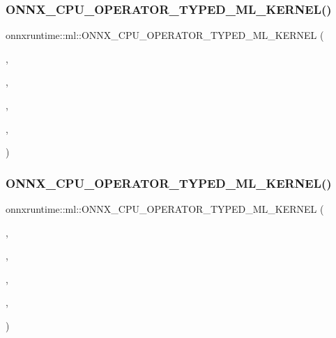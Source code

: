 \subsubsection{\texorpdfstring{O\+N\+N\+X\+\_\+\+C\+P\+U\+\_\+\+O\+P\+E\+R\+A\+T\+O\+R\+\_\+\+T\+Y\+P\+E\+D\+\_\+\+M\+L\+\_\+\+K\+E\+R\+N\+E\+L()}{ONNX\_CPU\_OPERATOR\_TYPED\_ML\_KERNEL()}\hspace{0.1cm}{\footnotesize\ttfamily [5/8]}}
{\footnotesize\ttfamily onnxruntime\+::ml\+::\+O\+N\+N\+X\+\_\+\+C\+P\+U\+\_\+\+O\+P\+E\+R\+A\+T\+O\+R\+\_\+\+T\+Y\+P\+E\+D\+\_\+\+M\+L\+\_\+\+K\+E\+R\+N\+EL (\begin{DoxyParamCaption}\item[{Scaler}]{,  }\item[{1}]{,  }\item[{float}]{,  }\item[{\mbox{\hyperlink{classonnxruntime_1_1KernelDefBuilder}{Kernel\+Def\+Builder}}().Type\+Constraint(\char`\"{}T\char`\"{}, Data\+Type\+Impl\+::\+Get\+Tensor\+Type$<$ float $>$()).May\+Inplace(0, 0)}]{,  }\item[{\mbox{\hyperlink{classonnxruntime_1_1ml_1_1ScalerOp}{Scaler\+Op}}$<$ float $>$}]{ }\end{DoxyParamCaption})}

\mbox{\label{namespaceonnxruntime_1_1ml_af22c68bb1af2f9cd1e8001474a54e67d}} 
\subsubsection{\texorpdfstring{O\+N\+N\+X\+\_\+\+C\+P\+U\+\_\+\+O\+P\+E\+R\+A\+T\+O\+R\+\_\+\+T\+Y\+P\+E\+D\+\_\+\+M\+L\+\_\+\+K\+E\+R\+N\+E\+L()}{ONNX\_CPU\_OPERATOR\_TYPED\_ML\_KERNEL()}\hspace{0.1cm}{\footnotesize\ttfamily [6/8]}}
{\footnotesize\ttfamily onnxruntime\+::ml\+::\+O\+N\+N\+X\+\_\+\+C\+P\+U\+\_\+\+O\+P\+E\+R\+A\+T\+O\+R\+\_\+\+T\+Y\+P\+E\+D\+\_\+\+M\+L\+\_\+\+K\+E\+R\+N\+EL (\begin{DoxyParamCaption}\item[{Scaler}]{,  }\item[{1}]{,  }\item[{double}]{,  }\item[{\mbox{\hyperlink{classonnxruntime_1_1KernelDefBuilder}{Kernel\+Def\+Builder}}().Type\+Constraint(\char`\"{}T\char`\"{}, Data\+Type\+Impl\+::\+Get\+Tensor\+Type$<$ double $>$()).May\+Inplace(0, 0)}]{,  }\item[{\mbox{\hyperlink{classonnxruntime_1_1ml_1_1ScalerOp}{Scaler\+Op}}$<$ double $>$}]{ }\end{DoxyParamCaption})}

